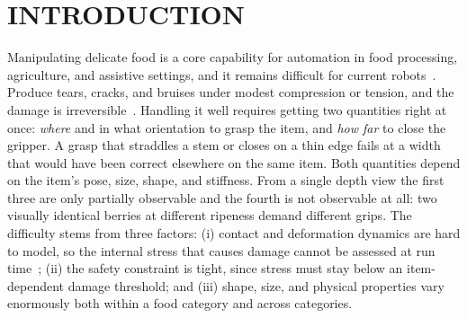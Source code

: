 %
%
\newcommand{\method}{\textsc{Method}}   %

\section{INTRODUCTION}

Manipulating delicate food is a core capability for automation in food processing,
agriculture, and assistive settings, and it remains difficult for current
robots~\cite{wang2025damageless}. Produce tears, cracks, and bruises under modest
compression or tension, and the damage is
irreversible~\cite{zhu2025deformable,blanco2024t}. Handling it well requires getting two
quantities right at once: \emph{where} and in what orientation to grasp the item, and
\emph{how far} to close the gripper. A grasp that straddles a stem or closes on a thin edge
fails at a width that would have been correct elsewhere on the same item. Both quantities
depend on the item's pose, size, shape, and stiffness. From a single depth view the first
three are only partially observable and the fourth is not observable at all: two visually
identical berries at different ripeness demand different grips. The difficulty stems from
three factors: (i) contact and deformation dynamics are hard to model, so the internal stress
that causes damage cannot be assessed at run
time~\cite{yin2021modeling,arriola2020modeling}; (ii) the safety constraint is tight, since
stress must stay below an item-dependent damage threshold; and (iii) shape, size, and
physical properties vary enormously both within a food category and across categories.

